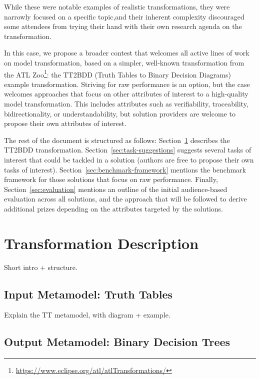 \documentclass[a4paper]{scrartcl}
\begin{document}
While these were notable examples of realistic transformations, they were
narrowly focused on a specific topic,and their inherent complexity discouraged
some attendees from trying their hand with their own research agenda on the
transformation.

In this case, we propose a broader contest that welcomes all active lines of
work on model transformation, based on a simpler, well-known transformation from
the ATL Zoo\footnote{\url{https://www.eclipse.org/atl/atlTransformations/}}: the
TT2BDD (Truth Tables to Binary Decision Diagrams) example transformation.
Striving for raw performance is an option, but the case welcomes approaches that
focus on other attributes of interest to a high-quality model transformation.
This includes attributes such as verifiability, traceability, bidirectionality,
or understandability, but solution providers are welcome to propose their own
attributes of interest.

The rest of the document is structured as follows:
Section~\ref{sec:transf-descr} describes the TT2BDD transformation.
Section~\ref{sec:task-suggestions} suggests several tasks of interest that could
be tackled in a solution (authors are free to propose their own tasks of
interest). Section~\ref{sec:benchmark-framework} mentions the benchmark
framework for those solutions that focus on raw performance. Finally,
Section~\ref{sec:evaluation} mentions an outline of the initial audience-based
evaluation across all solutions, and the approach that will be followed to
derive additional prizes depending on the attributes targeted by the solutions.

\section{Transformation Description}
\label{sec:transf-descr}

Short intro + structure.

\subsection{Input Metamodel: Truth Tables}
\label{sec:input-metam-truth}

Explain the TT metamodel, with diagram + example.

\subsection{Output Metamodel: Binary Decision Trees}
\label{sec:outp-metam-binary}
\end{document}
